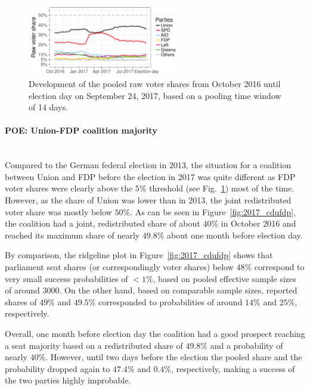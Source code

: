 \documentclass[smallcondensed]{svjour3}     %
\begin{document}
\begin{figure}[H]\centering
\includegraphics[width=0.6\textwidth]{figures/2017_pooled_rawShares.pdf}
\caption{Development of the pooled raw voter shares from October 2016 until
election day on September 24, 2017, based on a pooling time window of 14 days.
\label{fig:2017}
}
\end{figure}


\paragraph{POE: Union-FDP coalition majority} \ \\
Compared to the German federal election in 2013, the situation for a
coalition between Union and FDP before the election in 2017
was quite different as FDP voter shares were
clearly above the $5\%$ threshold (see Fig.~\ref{fig:2017}) most of the time.
However, as the share of Union was lower than in 2013,
the joint redistributed voter share was mostly below $50\%$.
As can be seen in Figure~\ref{fig:2017_cdufdp}, the coalition had
a joint, redistributed share of about $40\%$ in October 2016
and reached its maximum share of nearly $49.8\%$ about one month
before election day.

By comparison, the ridgeline plot in Figure~\ref{fig:2017_cdufdp}
shows that parliament seat shares (or correspondingly voter shares)
below $48\%$ correspond to very small success probabilities
of $<1\%$, based on pooled effective sample sizes of around $3000$.
On the other hand, based on comparable sample sizes, reported shares of $49\%$
and $49.5\%$ corresponded to probabilities of around $14\%$ and $25\%$,
respectively.

Overall, one month before election day the coalition had a good prospect
reaching a seat majority based on a redistributed share of $49.8\%$ and
a probability of nearly $40\%$. However, until two days before the election the pooled share and the probability dropped again to $47.4\%$ and $0.4\%$, respectively, making a success
of the two parties highly improbable.
\end{document}
